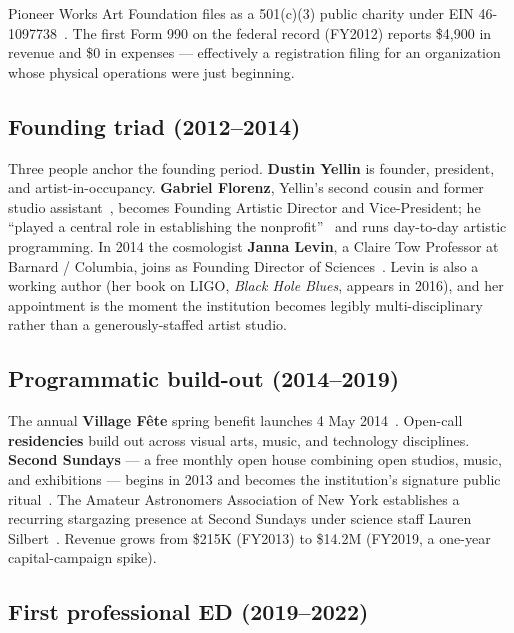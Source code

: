 \documentclass[10pt,letterpaper,twocolumn]{article}
\begin{document}
Pioneer Works Art Foundation files as a 501(c)(3) public charity under EIN 46-1097738~\citep{propublica2026pioneer}. The first Form 990 on the federal record (FY2012) reports \$4{,}900 in revenue and \$0 in expenses --- effectively a registration filing for an organization whose physical operations were just beginning.

\subsection{Founding triad (2012--2014)}

Three people anchor the founding period. \textbf{Dustin Yellin} is founder, president, and artist-in-occupancy. \textbf{Gabriel Florenz}, Yellin's second cousin and former studio assistant~\citep{artforum2025stepsdown}, becomes Founding Artistic Director and Vice-President; he ``played a central role in establishing the nonprofit''~\citep{wikipedia2026pioneer} and runs day-to-day artistic programming. In 2014 the cosmologist \textbf{Janna Levin}, a Claire Tow Professor at Barnard / Columbia, joins as Founding Director of Sciences~\citep{wikipedia2026pioneer}. Levin is also a working author (her book on LIGO, \emph{Black Hole Blues}, appears in 2016), and her appointment is the moment the institution becomes legibly multi-disciplinary rather than a generously-staffed artist studio.

\subsection{Programmatic build-out (2014--2019)}

The annual \textbf{Village F\^ete} spring benefit launches 4 May 2014~\citep{pioneerworks2014vf}. Open-call \textbf{residencies} build out across visual arts, music, and technology disciplines. \textbf{Second Sundays} --- a free monthly open house combining open studios, music, and exhibitions --- begins in 2013 and becomes the institution's signature public ritual~\citep{pioneerworks2025ss}. The Amateur Astronomers Association of New York establishes a recurring stargazing presence at Second Sundays under science staff Lauren Silbert~\citep{aaa2018pioneer}. Revenue grows from \$215K (FY2013) to \$14.2M (FY2019, a one-year capital-campaign spike).

\subsection{First professional ED (2019--2022)}
\end{document}
